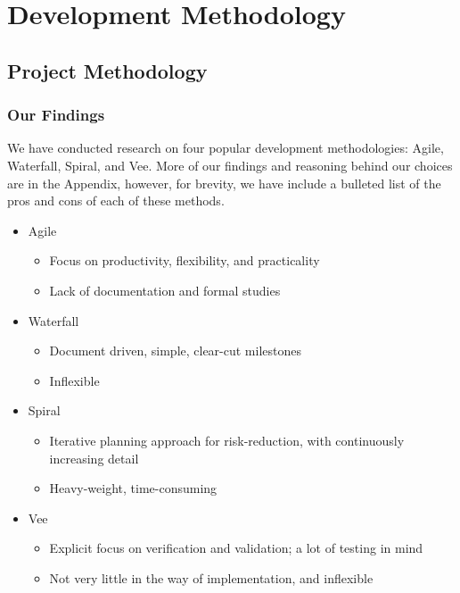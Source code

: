 \section{Development Methodology}
\label{sec:developmentmethodology}





\subsection{Project Methodology}
\subsubsection{Our Findings}
We have conducted research on four popular development methodologies: Agile, Waterfall, Spiral, and Vee. More of our findings and reasoning behind our choices are in the Appendix, however, for brevity, we have include a bulleted list of the pros and cons of each of these methods.


\begin{itemize}
    \item Agile
    \begin{itemize}
        \item Focus on productivity, flexibility, and practicality \cite{manifest}
        \item Lack of documentation and formal studies
    \end{itemize}
    \item Waterfall
    \begin{itemize}
        \item Document driven, simple, clear-cut milestones \cite{spiralmode;}
        \item Inflexible \cite{spiralmode;}
    \end{itemize}
    \item Spiral
    \begin{itemize}
        \item Iterative planning approach for risk-reduction, with continuously increasing detail \cite{spiralmode;}
        \item Heavy-weight, time-consuming
    \end{itemize}
    \item Vee
    \begin{itemize}
        \item Explicit focus on verification and validation; a lot of testing in mind \cite{geeksforgeeks_2023}
        \item Not very little in the way of implementation, and inflexible \cite{spiralmode;} \cite{geeksforgeeks_2023}
    \end{itemize}
\end{itemize}

